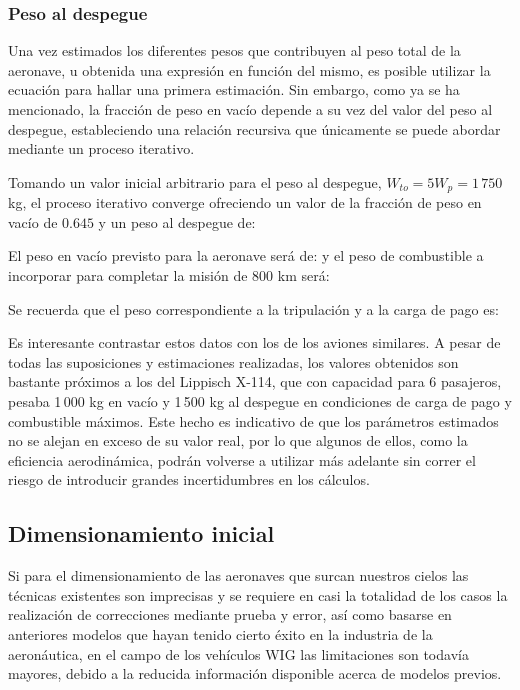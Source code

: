 \subsubsection{Peso al despegue}
\label{sec:design:weights:to}

Una vez estimados los diferentes pesos que contribuyen al peso total de la aeronave, u obtenida una expresión en función del mismo, es posible utilizar la ecuación  para hallar una primera estimación. Sin embargo, como ya se ha mencionado, la fracción de peso en vacío depende a su vez del valor del peso al despegue, estableciendo una relación recursiva que únicamente se puede abordar mediante un proceso iterativo.

Tomando un valor inicial arbitrario para el peso al despegue, $W_{to} = 5W_p = 1\,750$ kg, el proceso iterativo converge ofreciendo un valor de la fracción de peso en vacío de $0.645$ y un peso al despegue de:

El peso en vacío previsto para la aeronave será de:
y el peso de combustible a incorporar para completar la misión de 800 km será:

Se recuerda que el peso correspondiente a la tripulación y a la carga de pago es:

Es interesante contrastar estos datos con los de los aviones similares. A pesar de todas las suposiciones y estimaciones realizadas, los valores obtenidos son bastante próximos a los del Lippisch X-114, que con capacidad para 6 pasajeros, pesaba 1\,000 kg en vacío y 1\,500 kg al despegue en condiciones de carga de pago y combustible máximos. Este hecho es indicativo de que los parámetros estimados no se alejan en exceso de su valor real, por lo que algunos de ellos, como la eficiencia aerodinámica, podrán volverse a utilizar más adelante sin correr el riesgo de introducir grandes incertidumbres en los cálculos.


\subsection{Dimensionamiento inicial}
\label{sec:design:sizing}

Si para el dimensionamiento de las aeronaves que surcan nuestros cielos las técnicas existentes son imprecisas y se requiere en casi la totalidad de los casos la realización de correcciones mediante prueba y error, así como basarse en anteriores modelos que hayan tenido cierto éxito en la industria de la aeronáutica, en el campo de los vehículos WIG las limitaciones son todavía mayores, debido a la reducida información disponible acerca de modelos previos.

